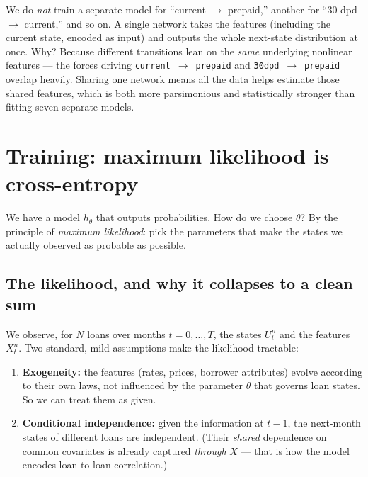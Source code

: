 \documentclass[11pt]{article}
\newcommand{\state}[1]{\texttt{#1}}
\begin{document}
\begin{keyidea}
We do \emph{not} train a separate model for ``current $\to$ prepaid,'' another for ``30 dpd
$\to$ current,'' and so on. A single network takes the features (including the current
state, encoded as input) and outputs the whole next-state distribution at once. Why?
Because different transitions lean on the \emph{same} underlying nonlinear features --- the
forces driving \state{current}~$\to$~\state{prepaid} and
\state{30dpd}~$\to$~\state{prepaid} overlap heavily. Sharing one network means all the data
helps estimate those shared features, which is both more parsimonious and statistically
stronger than fitting seven separate models.
\end{keyidea}

\section{Training: maximum likelihood is cross-entropy}
\label{sec:training}

We have a model $h_\theta$ that outputs probabilities. How do we choose $\theta$? By the
principle of \emph{maximum likelihood}: pick the parameters that make the states we actually
observed as probable as possible.

\subsection{The likelihood, and why it collapses to a clean sum}

We observe, for $N$ loans over months $t=0,\dots,T$, the states $U^n_t$ and the features
$X^n_t$. Two standard, mild assumptions make the likelihood tractable:

\begin{enumerate}[leftmargin=1.6em, itemsep=2pt]
  \item \textbf{Exogeneity:} the features (rates, prices, borrower attributes) evolve
        according to their own laws, not influenced by the parameter $\theta$ that governs
        loan states. So we can treat them as given.
  \item \textbf{Conditional independence:} given the information at $t-1$, the next-month
        states of different loans are independent. (Their \emph{shared} dependence on common
        covariates is already captured \emph{through} $X$ --- that is how the model encodes
        loan-to-loan correlation.)
\end{enumerate}
\end{document}
